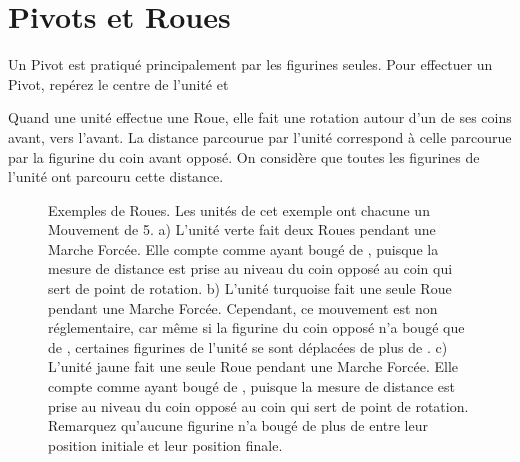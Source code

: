 \newpage
\section{Pivots et Roues}

Un Pivot est pratiqué principalement par les figurines seules. Pour effectuer un Pivot, repérez le centre de l'unité et 

Quand une unité effectue une Roue, elle fait une rotation autour d'un de ses coins avant, vers l'avant. La distance parcourue par l'unité correspond à celle parcourue par la figurine du coin avant opposé. On considère que toutes les figurines de l'unité ont parcouru cette distance.

\newcommand{\wheelsA}{a)}
\newcommand{\wheelsB}{b)}
\newcommand{\wheelsC}{c)}

\begin{figure}[!htbp]
\centering
\hypertarget{pivotsandwheelsfigure}{
\def\svgwidth{\textwidth}
}
\caption{Exemples de Roues.\vspace*{10pt}\newline
Les unités de cet exemple ont chacune un Mouvement de 5.\vspace*{10pt}\newline
a) L'unité verte fait deux Roues pendant une Marche Forcée. Elle compte comme ayant bougé de , puisque la mesure de distance est prise au niveau du coin opposé au coin qui sert de point de rotation.\vspace*{10pt}\newline
b) L'unité turquoise fait une seule Roue pendant une Marche Forcée. Cependant, ce mouvement est non réglementaire, car même si la figurine du coin opposé n'a bougé que de , certaines figurines de l'unité se sont déplacées de plus de .\vspace*{10pt}\newline
c) L'unité jaune fait une seule Roue pendant une Marche Forcée. Elle compte comme ayant bougé de , puisque la mesure de distance est prise au niveau du coin opposé au coin qui sert de point de rotation. Remarquez qu'aucune figurine n'a bougé de plus de  entre leur position initiale et leur position finale.}
\label{figure/wheels}
\end{figure}
